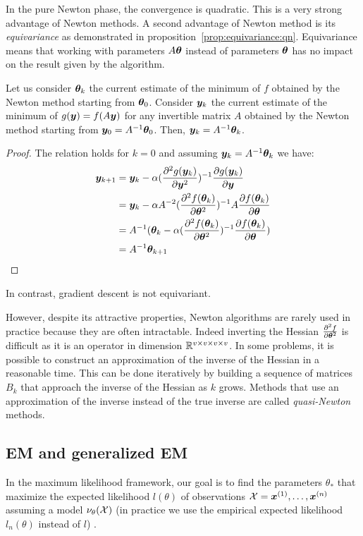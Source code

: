 In the pure Newton phase, the convergence is quadratic. This is a very strong
advantage of Newton methods.
A second advantage of Newton method is its \emph{equivariance} as demonstrated
in proposition~\ref{prop:equivariance:qn}. Equivariance means that working with
parameters $A \thetab$ instead of parameters $\thetab$ has no impact on the result given
by the algorithm.
\begin{prop}
  \label{prop:equivariance:qn}
  Let us consider $\thetab_k$ the current estimate of the minimum of $f$ obtained by
  the Newton method starting from $\thetab_0$.
  Consider $\yb_k$ the current estimate of the minimum of $g(\yb) = f(A\yb)$ for any
  invertible matrix $A$ obtained by the Newton method starting from $\yb_0 = A^{-1}\thetab_0$.
  Then, $\yb_k = A^{-1} \thetab_k$.
\end{prop}
\begin{proof}
  The relation holds for $k=0$ and assuming $\yb_k = A^{-1} \thetab_k$ we have:
\begin{align}
  \yb_{k+1} &= \yb_k -\alpha (\partialfrac{\yb^2}{^2 g(\yb_k)})^{-1} \partialfrac{\yb}{g(\yb_k)} \\
  &= \yb_k -\alpha A^{-2}(\partialfrac{\thetab^2}{^2 f(\thetab_k)})^{-1} A \partialfrac{\thetab}{f(\thetab_k)} \\
  &= A^{-1} (\thetab_k -\alpha (\partialfrac{\thetab^2}{^2 f(\thetab_k)})^{-1} \partialfrac{\thetab}{f( \thetab_k)}) \\
            &= A^{-1} \thetab_{k+1} \\
\end{align}
\end{proof}
In contrast, gradient descent is not equivariant.

However, despite its attractive properties, Newton algorithms are rarely used in
practice because they are often intractable. Indeed inverting
the Hessian $\partialfrac{\thetab^2}{^2 f}$ is difficult as it is an operator in
dimension $\RR^{v \times v \times v \times
  v}$.
In some problems, it is possible to construct an approximation of the inverse of
the Hessian in a reasonable time. This can be done iteratively by building a
sequence of matrices $B_k$ that approach the inverse of the Hessian as $k$ grows.
Methods that use an approximation of the inverse instead of the true inverse are
called \emph{quasi-Newton} methods. 

\subsection{EM and generalized EM}
In the maximum likelihood framework, our goal is to find the parameters
$\theta_*$ that maximize the expected likelihood $l(\theta)$ of
observations $\Xcal = \xb^{(1)}, \dots, \xb^{(n)}$ assuming a model
$\nu_{\theta}(\Xcal)$ (in practice we use
the empirical expected likelihood $l_n(\theta)$ instead of $l$) .

